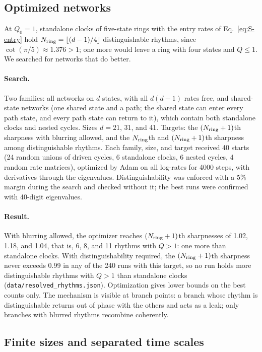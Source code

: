 \subsection{Optimized networks}\label{sec:optimized}

At $Q_0=1$, standalone clocks of five-state rings with the entry rates of Eq.~\eqref{eq:S-entry} hold $N_{\rm ring}=\lfloor(d-1)/4\rfloor$ distinguishable rhythms, since $\cot(\pi/5)\approx1.376>1$; one more would leave a ring with four states and $Q\le1$. We searched for networks that do better.

\paragraph*{Search.} Two families: all networks on $d$ states, with all $d(d-1)$ rates free, and shared-state networks (one shared state and a path; the shared state can enter every path state, and every path state can return to it), which contain both standalone clocks and nested cycles. Sizes $d=21$, 31, and 41. Targets: the $(N_{\rm ring}+1)$th sharpness with blurring allowed, and the $N_{\rm ring}$th and $(N_{\rm ring}+1)$th sharpness among distinguishable rhythms. Each family, size, and target received 40 starts (24 random unions of driven cycles, 6 standalone clocks, 6 nested cycles, 4 random rate matrices), optimized by Adam on all log-rates for 4000 steps, with derivatives through the eigenvalues. Distinguishability was enforced with a 5\% margin during the search and checked without it; the best runs were confirmed with 40-digit eigenvalues.

\paragraph*{Result.} With blurring allowed, the optimizer reaches $(N_{\rm ring}+1)$th sharpnesses of 1.02, 1.18, and 1.04, that is, 6, 8, and 11 rhythms with $Q>1$: one more than standalone clocks. With distinguishability required, the $(N_{\rm ring}+1)$th sharpness never exceeds 0.99 in any of the 240 runs with this target, so no run holds more distinguishable rhythms with $Q>1$ than standalone clocks (\texttt{data/resolved\_rhythms.json}). Optimization gives lower bounds on the best counts only. The mechanism is visible at branch points: a branch whose rhythm is distinguishable returns out of phase with the others and acts as a leak; only branches with blurred rhythms recombine coherently.

\subsection{Finite sizes and separated time scales}\label{sec:additive}

